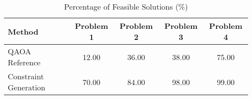 \begin{table}[h]
\centering
\caption{Percentage of Feasible Solutions (\%)}
\begin{tabular}{lcccc}
\hline
Method & Problem 1 & Problem 2 & Problem 3 & Problem 4 \\
\hline
QAOA Reference & 12.00 & 36.00 & 38.00 & 75.00 \\
Constraint Generation & 70.00 & 84.00 & 98.00 & 99.00 \\
\hline
\end{tabular}
\end{table}